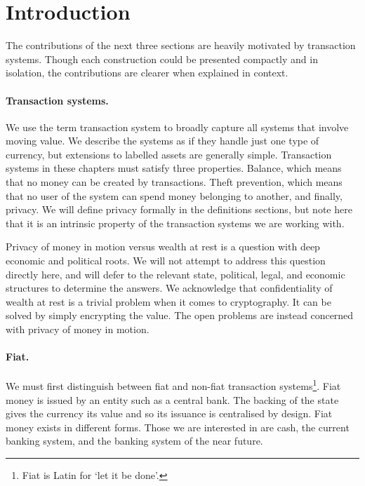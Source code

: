 \section{Introduction}

The contributions of the next three sections are heavily motivated by
transaction systems. Though each construction could be presented compactly and
in isolation, the contributions are clearer when explained in context.

\paragraph{Transaction systems.} We use the term transaction system to broadly
capture all systems that involve moving value. We describe the systems as if
they handle just one type of currency, but extensions to labelled assets are
generally simple. Transaction systems in these chapters must satisfy three
properties. Balance, which means that no money can be created by transactions.
Theft prevention, which means that no user of the system can spend money
belonging to another, and finally, privacy. We will define privacy formally in
the definitions sections, but note here that it is an intrinsic property of the
transaction systems we are working with.

Privacy of money in motion versus wealth at rest is a question with deep
economic and political roots. We will not attempt to address this question
directly here, and will defer to the relevant state, political, legal, and
economic structures to determine the answers.
We acknowledge that confidentiality of wealth at rest is a trivial problem when
it comes to cryptography. It can be solved by simply encrypting the value. The
open problems are instead concerned with privacy of money in motion.

\paragraph{Fiat.} We must first distinguish between fiat and non-fiat
transaction systems\footnote{Fiat is Latin for `let it be done'.}. Fiat money
is issued by an entity such as a central bank. The backing of the state gives
the currency its value and so its issuance is centralised by design. Fiat money
exists in different forms. Those we are interested in are cash, the current
banking system, and the banking system of the near future.

